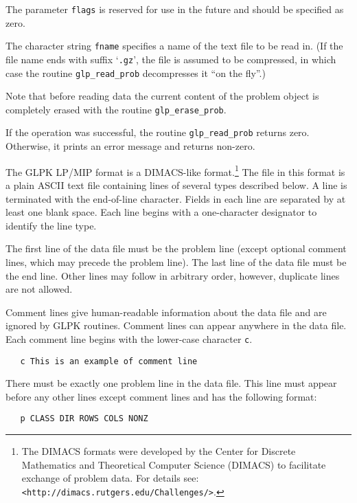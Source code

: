 The parameter \verb|flags| is reserved for use in the future and should
be specified as zero.

The character string \verb|fname| specifies a name of the text file to
be read in. (If the file name ends with suffix `\verb|.gz|', the file
is assumed to be compressed, in which case the routine
\verb|glp_read_prob| decompresses it ``on the fly''.)

Note that before reading data the current content of the problem object
is completely erased with the routine \verb|glp_erase_prob|.

\returns

If the operation was successful, the routine \verb|glp_read_prob|
returns zero. Otherwise, it prints an error message and returns
non-zero.

\newpage


The GLPK LP/MIP format is a DIMACS-like format.\footnote{The DIMACS
formats were developed by the Center for Discrete Mathematics and
Theoretical Computer Science (DIMACS) to facilitate exchange of problem
data. For details see: {\tt <http://dimacs.rutgers.edu/Challenges/>}. }
The file in this format is a plain ASCII text file containing lines of
several types described below. A line is terminated with the
end-of-line character. Fields in each line are separated by at least
one blank space. Each line begins with a one-character designator to
identify the line type.

The first line of the data file must be the problem line (except
optional comment lines, which may precede the problem line). The last
line of the data file must be the end line. Other lines may follow in
arbitrary order, however, duplicate lines are not allowed.

 Comment lines give human-readable
information about the data file and are ignored by GLPK routines.
Comment lines can appear anywhere in the data file. Each comment line
begins with the lower-case character \verb|c|.

\begin{verbatim}
   c This is an example of comment line
\end{verbatim}

 There must be exactly one problem line in the
data file. This line must appear before any other lines except comment
lines and has the following format:

\begin{verbatim}
   p CLASS DIR ROWS COLS NONZ
\end{verbatim}

